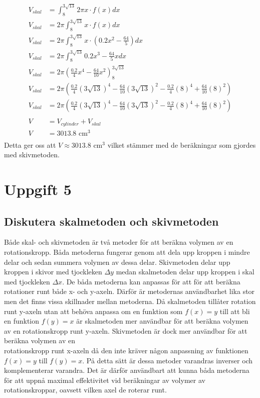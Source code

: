 \documentclass[12pt]{article}
\begin{document}
\begin{align*}
    V_{skal}&=\int_{8}^{3\sqrt{13}}2\pi x\cdot f(x) dx\\
    V_{skal}&=2\pi\int_{8}^{3\sqrt{13}}x\cdot f(x) dx\\
    V_{skal}&=2\pi\int_{8}^{3\sqrt{13}}x\cdot (0.2x^2-\frac{64}{5}) dx\\
    V_{skal}&=2\pi\int_{8}^{3\sqrt{13}}0.2x^3-\frac{64}{5}x dx\\
    V_{skal}&=2\pi{\left(\frac{0.2}{4}x^4-\frac{64}{10}x^2\right)}_{8}^{3\sqrt{13}}\\
    V_{skal}&=2\pi\left(\frac{0.2}{4}{(3\sqrt{13})}^4-\frac{64}{10}{(3\sqrt{13})}^2-\frac{0.2}{4}{(8)}^4+\frac{64}{10}{(8)}^2\right)\\
    V_{skal}&=2\pi\left(\frac{0.2}{4}{(3\sqrt{13})}^4-\frac{64}{10}{(3\sqrt{13})}^2-\frac{0.2}{4}{(8)}^4+\frac{64}{10}{(8)}^2\right)\\
    \\
    V&=V_{cylinder}+V_{skal}\\
    V&=3013.8 \text { cm}^3\\
\end{align*}
Detta ger oss att $V\approx 3013.8 \text { cm}^3$ vilket stämmer med de beräkningar som gjordes med skivmetoden.
\newpage
\section*{Uppgift 5}
\subsection*{Diskutera skalmetoden och skivmetoden}
Både skal- och skivmetoden är två metoder för att beräkna volymen av en rotationskropp. Båda metoderna fungerar genom att dela upp kroppen i mindre delar och sedan summera volymen av dessa delar. Skivmetoden delar upp kroppen i skivor med tjockleken $\Delta y$ medan skalmetoden delar upp kroppen i skal med tjockleken $\Delta x$. De båda metoderna kan anpassas för att för att beräkna rotationer runt både x- och y-axeln. Därför är metodernas användbarhet lika stor men det finns vissa skillnader mellan metoderna. Då skalmetoden tillåter rotation runt y-axeln utan att behöva anpassa om en funktion som $f(x)=y$ till att bli en funktion $f(y)=x$ är skalmetoden mer användbar för att beräkna volymen av en rotationskropp runt y-axeln. Skivmetoden är dock mer användbar för att beräkna volymen av en\\ rotationskropp runt x-axeln då den inte kräver någon anpassning av funktionen $f(x)=y$ till $f(y)=x$. På detta sätt är dessa metoder varandras inverser och komplementerar varandra. Det är därför användbart att kunna båda metoderna för att uppnå maximal effektivitet vid beräkningar av volymer av rotationskroppar, oavsett vilken axel de roterar runt.
\end{document}
